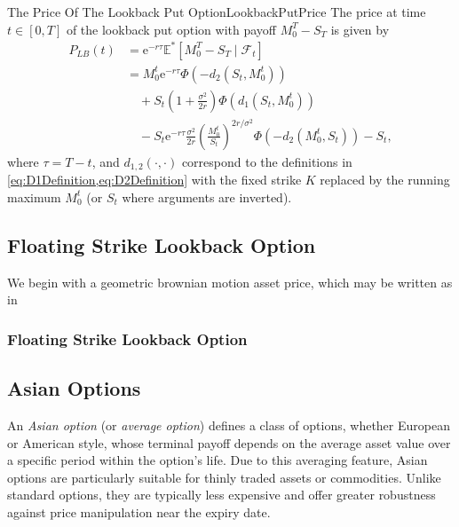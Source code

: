 \begin{prop}{The Price Of The Lookback Put Option}{LookbackPutPrice}
	The price at time \(t \in [0,T]\) of the lookback put option with payoff \(M_0^T - S_T\) is given by
	\begin{align} \label{eq:LookbackPutPrice}
		P_{LB}(t) & = \mathrm{e}^{-r\tau} \mathbb{E}^\ast \left[ M_0^T - S_T \mid \mathcal{F}_t \right] \nonumber                                                             \\
		          & = M_0^t \mathrm{e}^{-r\tau} \Phi \left( -d_2\left(S_t, M_0^t\right) \right) \nonumber                                                                     \\
		          & \quad + S_t \left( 1 + \frac{\sigma^2}{2r} \right) \Phi \left( d_1\left(S_t, M_0^t\right) \right) \nonumber                                               \\
		          & \quad - S_t \mathrm{e}^{-r\tau} \frac{\sigma^2}{2r} \left( \frac{M_0^t}{S_t} \right)^{2r/\sigma^2} \Phi \left( -d_2\left(M_0^t, S_t\right) \right) - S_t,
	\end{align}
	where \(\tau = T-t\), and \(d_{1,2}(\cdot, \cdot)\) correspond to the definitions in \cref{eq:D1Definition,eq:D2Definition} with the fixed strike \(K\) replaced by the running maximum \(M_0^t\) (or \(S_t\) where arguments are inverted).
\end{prop}

\subsection{Floating Strike Lookback Option}

We begin with a geometric brownian motion asset price, which may be written as in



\subsubsection{Floating Strike Lookback Option}

\subsection{Asian Options}
An \emph{Asian option} (or \emph{average option}) defines a class of options, whether European or American style, whose terminal payoff depends on the average asset value over a specific period within the option's life. Due to this averaging feature, Asian options are particularly suitable for thinly traded assets or commodities. Unlike standard options, they are typically less expensive and offer greater robustness against price manipulation near the expiry date.

